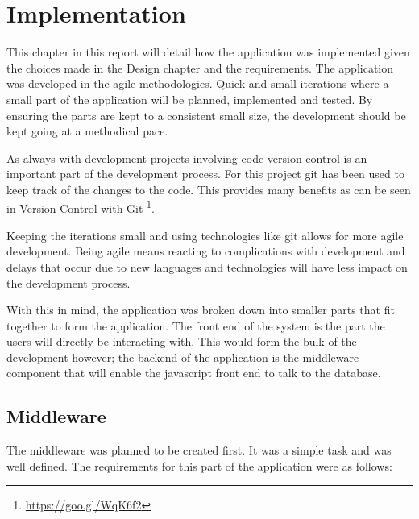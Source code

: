 \chapter{Implementation}\label{implementation}

This chapter in this report will detail how the application was
implemented given the choices made in the Design chapter and the
requirements. The application was developed in the agile methodologies.
Quick and small iterations where a small part of the application will be
planned, implemented and tested. By ensuring the parts are kept to a
consistent small size, the development should be kept going at a
methodical pace.

As always with development projects involving code version control is an
important part of the development process. For this project git has been
used to keep track of the changes to the code. This provides many
benefits as can be seen in Version Control with Git
\footnote{\url{https://goo.gl/WqK6f2}}.

Keeping the iterations small and using technologies like git allows for more
agile development. Being agile means reacting to complications with development
and delays that occur due to new languages and technologies will have less
impact on the development process.

With this in mind, the application was broken down into smaller parts
that fit together to form the application. The front end of the system
is the part the users will directly be interacting with. This would form
the bulk of the development however; the backend of the application is
the middleware component that will enable the javascript front end to
talk to the database.

\section{Middleware}\label{middleware}

The middleware was planned to be created first. It was a simple task and
was well defined. The requirements for this part of the application were
as follows:

